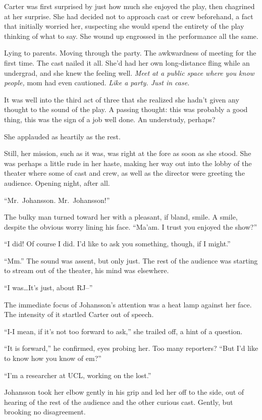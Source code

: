Carter was first surprised by just how much she enjoyed the play, then chagrined at her surprise. She had decided not to approach cast or crew beforehand, a fact that initially worried her, suspecting she would spend the entirety of the play thinking of what to say. She wound up engrossed in the performance all the same.

Lying to parents. Moving through the party. The awkwardness of meeting for the first time. The cast nailed it all. She'd had her own long-distance fling while an undergrad, and she knew the feeling well. \emph{Meet at a public space where you know people,} mom had even cautioned. \emph{Like a party. Just in case.}

It was well into the third act of three that she realized she hadn't given any thought to the sound of the play. A passing thought: this was probably a good thing, this was the sign of a job well done. An understudy, perhaps?

She applauded as heartily as the rest.

Still, her mission, such as it was, was right at the fore as soon as she stood. She was perhaps a little rude in her haste, making her way out into the lobby of the theater where some of cast and crew, as well as the director were greeting the audience. Opening night, after all.

``Mr.~Johansson. Mr.~Johansson!''

The bulky man turned toward her with a pleasant, if bland, smile. A smile, despite the obvious worry lining his face. ``Ma'am. I trust you enjoyed the show?''

``I did! Of course I did. I'd like to ask you something, though, if I might.''

``Mm.'' The sound was assent, but only just. The rest of the audience was starting to stream out of the theater, his mind was elsewhere.

``I was\ldots{}It's just, about RJ--''

The immediate focus of Johansson's attention was a heat lamp against her face. The intensity of it startled Carter out of speech.

``I-I mean, if it's not too forward to ask,'' she trailed off, a hint of a question.

``It is forward,'' he confirmed, eyes probing her. Too many reporters? ``But I'd like to know how you know of em?''

``I'm a researcher at UCL, working on the lost.''

Johansson took her elbow gently in his grip and led her off to the side, out of hearing of the rest of the audience and the other curious cast. Gently, but brooking no disagreement.

